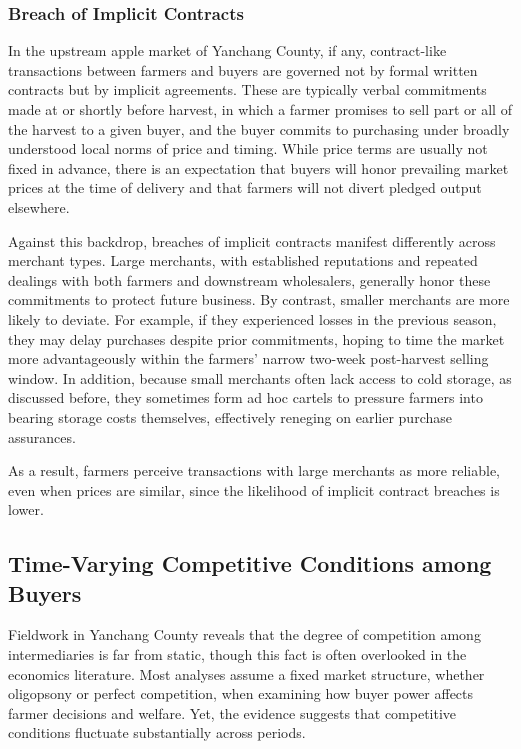 \subsubsection{Breach of Implicit Contracts}
\noindent 
In the upstream apple market of Yanchang County, if any, contract-like transactions between farmers and buyers are governed not by formal written contracts but by implicit agreements. These are typically verbal commitments made at or shortly before harvest, in which a farmer promises to sell part or all of the harvest to a given buyer, and the buyer commits to purchasing under broadly understood local norms of price and timing. While price terms are usually not fixed in advance, there is an expectation that buyers will honor prevailing market prices at the time of delivery and that farmers will not divert pledged output elsewhere.

Against this backdrop, breaches of implicit contracts manifest differently across merchant types. Large merchants, with established reputations and repeated dealings with both farmers and downstream wholesalers, generally honor these commitments to protect future business. By contrast, smaller merchants are more likely to deviate. For example, if they experienced losses in the previous season, they may delay purchases despite prior commitments, hoping to time the market more advantageously within the farmers’ narrow two-week post-harvest selling window. In addition, because small merchants often lack access to cold storage, as discussed before, they sometimes form ad hoc cartels to pressure farmers into bearing storage costs themselves, effectively reneging on earlier purchase assurances.  

As a result, farmers perceive transactions with large merchants as more reliable, even when prices are similar, since the likelihood of implicit contract breaches is lower.









\subsection{Time-Varying Competitive Conditions among Buyers}
\noindent 
Fieldwork in Yanchang County reveals that the degree of competition among intermediaries is far from static, though this fact is often overlooked in the economics literature. Most analyses assume a fixed market structure, whether oligopsony or perfect competition, when examining how buyer power affects farmer decisions and welfare. Yet, the evidence suggests that competitive conditions fluctuate substantially across periods.  

